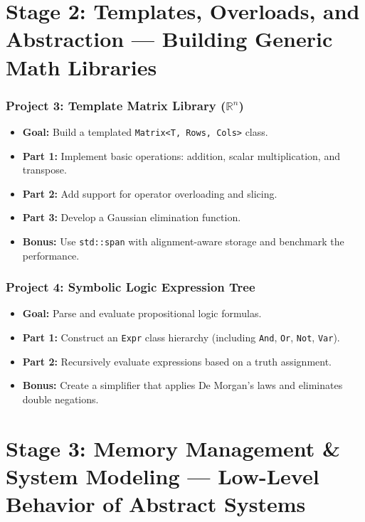 \documentclass[12pt]{article}
\begin{document}
\section{Stage 2: Templates, Overloads, and Abstraction --- Building Generic Math Libraries}
\subsubsection*{Project 3: Template Matrix Library ($\mathbb{R}^n$)}
\begin{itemize}[leftmargin=*]
    \item \textbf{Goal:} Build a templated \texttt{Matrix<T, Rows, Cols>} class.
    \item \textbf{Part 1:} Implement basic operations: addition, scalar multiplication, and transpose.
    \item \textbf{Part 2:} Add support for operator overloading and slicing.
    \item \textbf{Part 3:} Develop a Gaussian elimination function.
    \item \textbf{Bonus:} Use \texttt{std::span} with alignment-aware storage and benchmark the performance.
\end{itemize}

\subsubsection*{Project 4: Symbolic Logic Expression Tree}
\begin{itemize}[leftmargin=*]
    \item \textbf{Goal:} Parse and evaluate propositional logic formulas.
    \item \textbf{Part 1:} Construct an \texttt{Expr} class hierarchy (including \texttt{And}, \texttt{Or}, \texttt{Not}, \texttt{Var}).
    \item \textbf{Part 2:} Recursively evaluate expressions based on a truth assignment.
    \item \textbf{Bonus:} Create a simplifier that applies De Morgan’s laws and eliminates double negations.
\end{itemize}

\section{Stage 3: Memory Management \& System Modeling --- Low-Level Behavior of Abstract Systems}
\end{document}
